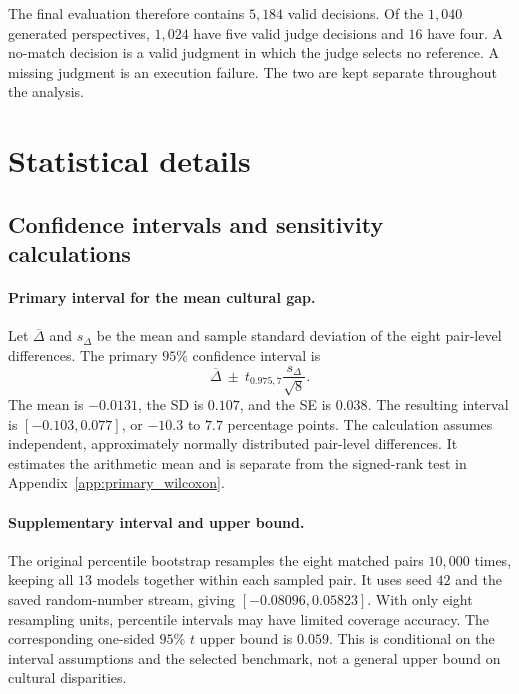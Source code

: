 \documentclass[11pt,a4paper]{article}
\begin{document}
The final evaluation therefore contains $5,184$ valid decisions. Of the $1,040$ generated perspectives, $1,024$ have five valid judge decisions and $16$ have four. A no-match decision is a valid judgment in which the judge selects no reference. A missing judgment is an execution failure. The two are kept separate throughout the analysis.

\section{Statistical details}
\label{app:statistics}

\subsection{Confidence intervals and sensitivity calculations}
\label{app:bootstrap}

\paragraph{Primary interval for the mean cultural gap.}
Let $\overline\Delta$ and $s_\Delta$ be the mean and sample standard deviation of the eight pair-level differences. The primary $95\%$ confidence interval is
\[
\overline\Delta\ \pm\ t_{0.975,7}\frac{s_\Delta}{\sqrt{8}}.
\]
The mean is $-0.0131$, the SD is $0.107$, and the SE is $0.038$. The resulting interval is $[-0.103,0.077]$, or $-10.3$ to $7.7$ percentage points. The calculation assumes independent, approximately normally distributed pair-level differences. It estimates the arithmetic mean and is separate from the signed-rank test in Appendix~\ref{app:primary_wilcoxon}.

\paragraph{Supplementary interval and upper bound.}
The original percentile bootstrap resamples the eight matched pairs $10{,}000$ times, keeping all $13$ models together within each sampled pair. It uses seed $42$ and the saved random-number stream, giving $[-0.08096,0.05823]$. With only eight resampling units, percentile intervals may have limited coverage accuracy. The corresponding one-sided $95\%$ $t$ upper bound is $0.059$. This is conditional on the interval assumptions and the selected benchmark, not a general upper bound on cultural disparities.
\end{document}
